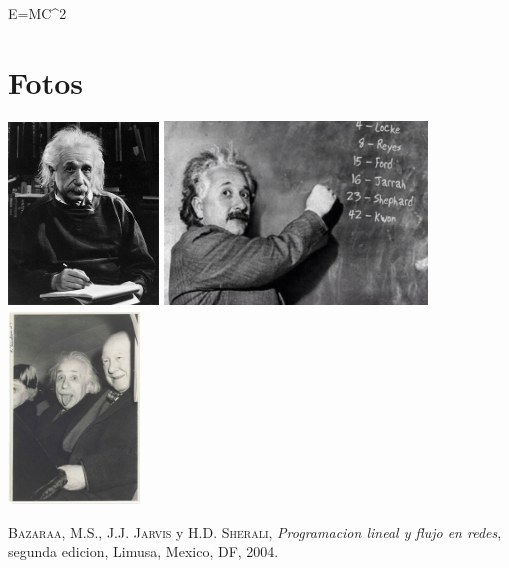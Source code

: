 \documentclass[a4paper,openright,12pt]{report}
\begin{document}
\begin{titlepage}
\begin{large}
\begin{flushleft}
\vspace*{0.6in}

\begin{center}
{\Large E=MC^2}
\end{center}
\end{flushleft}

\chapter{Fotos}\label{cap.desenlace}
\includegraphics[width=4cm]{./images/1}
\includegraphics[width=7cm]{./images/2}
\includegraphics[width=3.5cm]{./images/3}



\end{large}
\begin{thebibliography}{X}
 \textsc{Bazaraa, M.S., J.J. Jarvis} y \textsc{H.D. Sherali},
\textit{Programaci\’on lineal y flujo en redes}, segunda edici\’on,
Limusa, M\’exico, DF, 2004.

\end{thebibliography}

\end{titlepage}
\end{document}
